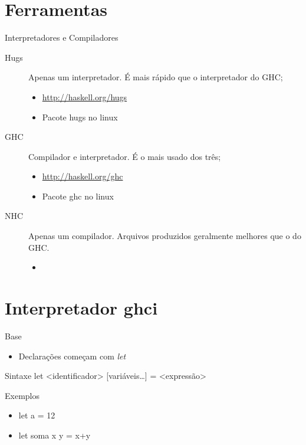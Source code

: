 \documentclass{beamer}
\begin{document}
\section{Ferramentas}

	\begin{frame}{Interpretadores e Compiladores}
	 
	 \begin{description}
	  \item [Hugs] Apenas um interpretador. É mais rápido que o interpretador do GHC;
			\begin{itemize}
			 \item \url{http://haskell.org/hugs}
			 \item Pacote hugs no linux
			\end{itemize}
	  \item [GHC] Compilador e interpretador. É o mais usado dos três;
			\begin{itemize}
			 \item \url{http://haskell.org/ghc}
			 \item Pacote ghc no linux
			\end{itemize}
	  \item [NHC] Apenas um compilador. Arquivos produzidos geralmente melhores que o do GHC.
			\begin{itemize}
			 \item 
			\end{itemize}
	 \end{description}	 
	\end{frame}
	
\section{Interpretador ghci}

	\begin{frame}{Base}
	 	 \begin{itemize}
	 	  \item Declarações começam com \textit{let}
	 	 \end{itemize}
	 	 \begin{block}{Sintaxe}
	 	  let <identificador> {[}variáveis\dots{]} = <expressão>
	 	 \end{block}
	 	 \begin{block}{Exemplos}
	 	  \begin{itemize}
	 	   \item let a = 12
	 	   \item let soma x y = x+y
	 	  \end{itemize}
	 	 \end{block}
	\end{frame}
	
\end{document}
